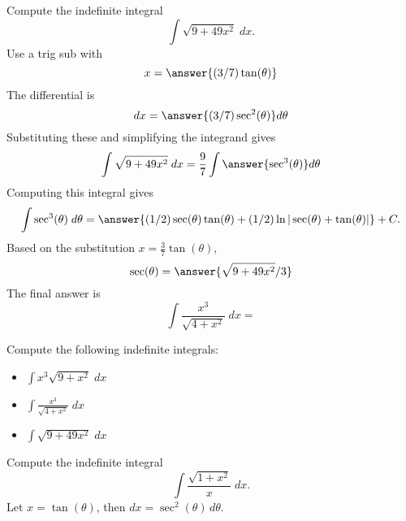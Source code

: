 \documentclass{ximera}
\begin{document}
\begin{problem}
Compute the indefinite integral
\[
\int \sqrt{9 + 49x^2} \; dx.
\]
Use a trig sub with\\
\[
x = \answer{(3/7)\tan(\theta)}
\]
The differential is\\
\[
dx = \answer{(3/7)\sec^2(\theta)}d\theta
\]
Substituting these and simplifying the integrand gives\\
\[
\int \sqrt{9 + 49x^2} \; dx = \frac97 \int \answer{\sec^3(\theta)} d\theta
\]
Computing this integral gives
\[
\int \sec^3(\theta) \; d\theta = \answer{(1/2)\sec(\theta) \tan(\theta) + (1/2)\ln|\sec(\theta)+\tan(\theta)|} + C.
\]
Based on the substitution $x = \frac37 \tan(\theta)$, \\
\[
\sec(\theta) = \answer{\sqrt{9+49x^2}/3}
\]
The final answer is
\[
\int  \frac{x^3}{\sqrt{4 + x^2}} \; dx = 
\]
\begin{center}
\begin{multipleChoice}
\end{multipleChoice}
\end{center}
\end{problem}




\begin{problem}
Compute the following indefinite integrals:
\begin{itemize}
\item $\displaystyle{\int   x^3\sqrt{9 + x^2}\; dx}$
\item $\displaystyle{\int   \frac{x^3}{\sqrt{4 + x^2}} \; dx}$
\item $\displaystyle{\int \sqrt{9 + 49x^2} \; dx}$
\end{itemize}

\end{problem}



\begin{example}
Compute the indefinite integral
\[
\int\frac{\sqrt{1+x^2}}{x}\; dx.
\]
Let $x = \tan(\theta)$, then $dx = \sec^2(\theta) \, d\theta$.
\end{example}
\end{document}
